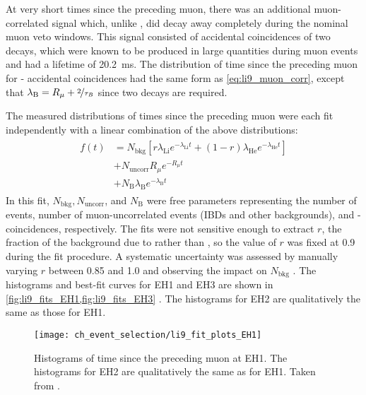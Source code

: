 At very short times since the preceding muon,
there was an additional muon-correlated signal
which, unlike \li{}, did decay away completely
during the nominal muon veto windows.
This signal consisted of accidental coincidences
of two \boron{} decays,
which were known to be produced in large quantities
during muon events \cite{kamland_li9}
and had a lifetime of \SI{20.2}{\ms}.
The distribution of time since the preceding muon
for \boron{}-\boron{} accidental coincidences
had the same form as \cref{eq:li9_muon_corr},
except that $\lambda_\text{B} = R_\mu + \nicefrac{2}{\tau_{B}}$
since two \boron{} decays are required.

The measured distributions of times since the preceding muon
were each fit independently with a linear combination of the above distributions:
\begin{align}\label{eq:li9_fit_fn}
    \begin{split}
        f(t) &= N_\text{bkg} \left[r \lambda_\text{Li} e^{-\lambda_\text{Li} t}
        + (1-r) \lambda_\text{He} e^{-\lambda_\text{He} t}\right] \\
             &+ N_\text{uncorr} R_\mu e^{-R_\mu t} \\
             &+ N_\text{B} \lambda_\text{B} e^{-\lambda_\text{B} t}
    \end{split}
\end{align}
In this fit, $N_\text{bkg}, N_\text{uncorr}$, and $N_\text{B}$
were free parameters representing the number of \li{} events,
number of muon-uncorrelated events (IBDs and other backgrounds),
and \boron{}-\boron{} coincidences, respectively.
The fits were not sensitive enough to extract $r$,
the fraction of the background due to \li{} rather than \he{},
so the value of $r$ was fixed at 0.9 during the fit procedure.
A systematic uncertainty was assessed by manually varying $r$
between 0.85 and 1.0
and observing the impact on $N_\text{bkg}$ \cite{li9_details}.
The histograms and best-fit curves for EH1 and EH3 are shown
in \cref{fig:li9_fits_EH1,fig:li9_fits_EH3} \cite{jinjing_2020may}.
The histograms for EH2 are qualitatively the same as those for EH1.

\begin{figure}
    \centering
    \texttt{[image: ch\_event\_selection/li9\_fit\_plots\_EH1]}
    \caption[Time-since-muon histograms for EH1]{
        Histograms of time since the preceding muon at EH1.
        The histograms for EH2 are qualitatively the same as for EH1.
        Taken from \cite{jinjing_2020may}.
    }
    \label{fig:li9_fits_EH1}
\end{figure}

